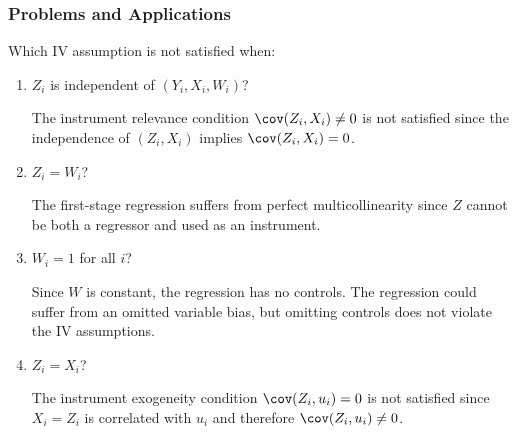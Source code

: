 \begin{frame}
\frametitle{Problems and Applications}
Which IV assumption is not satisfied when:

\begin{enumerate}

\item $Z_{i}$ is independent of $(Y_{i}, X_{i}, W_{i})$?
\begin{answer}
The instrument relevance condition $\cov(Z_{i},X_{i})\neq0$ is not satisfied since the independence of $(Z_{i},X_{i})$ implies $\cov(Z_{i},X_{i})=0$.
\end{answer}

\item $Z_{i}=W_{i}$?

\begin{answer}
The first-stage regression suffers from perfect multicollinearity since $Z$ cannot be both a regressor and used as an instrument. 
\end{answer}

\item $W_{i}=1$ for all $i$?

\begin{answer}
Since $W$ is constant, the regression has no controls. The regression could suffer from an omitted variable bias, but omitting controls does not violate the IV assumptions.
\end{answer}

\item $Z_{i}=X_{i}$?

\begin{answer}
The instrument exogeneity condition $\cov(Z_{i},u_{i})=0$ is not satisfied since $X_{i}=Z_{i}$ is correlated with $u_{i}$ and therefore $\cov(Z_{i},u_{i})\neq0$.
\end{answer}

\end{enumerate}
\end{frame}



